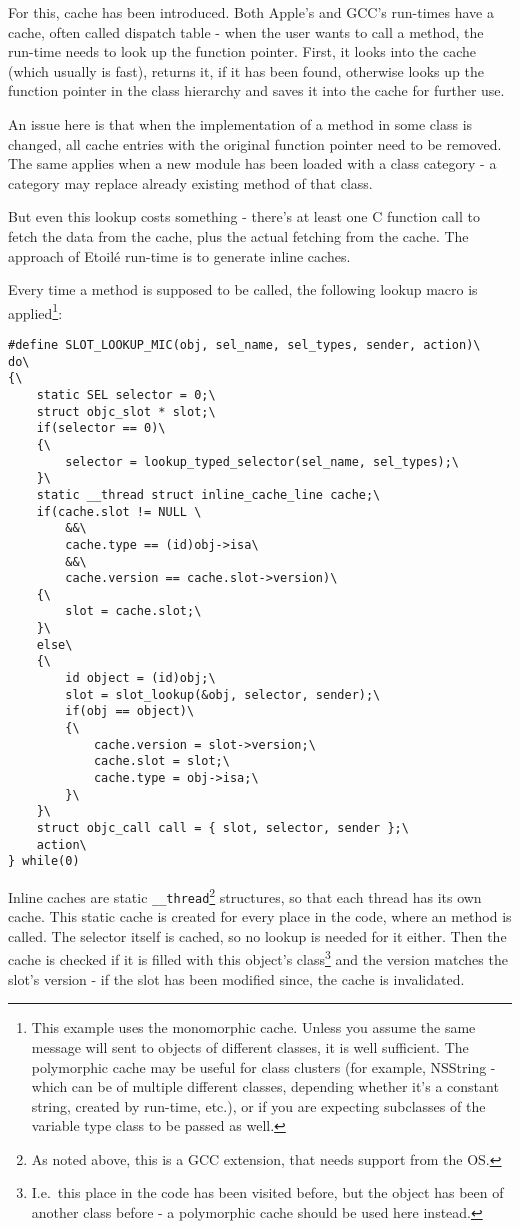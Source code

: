 For this, cache has been introduced. Both Apple's and GCC's run-times have a cache, often called dispatch table - when the user wants to call a method, the run-time needs to look up the function pointer. First, it looks into the cache (which usually is fast), returns it, if it has been found, otherwise looks up the function pointer in the class hierarchy and saves it into the cache for further use.

An issue here is that when the implementation of a method in some class is changed, all cache entries with the original function pointer need to be removed. The same applies when a new module has been loaded with a class category - a category may replace already existing method of that class.

But even this lookup costs something - there's at least one C function call to fetch the data from the cache, plus the actual fetching from the cache. The approach of Etoil\'e run-time is to generate inline caches.

Every time a method is supposed to be called, the following lookup macro is applied\footnote{This example uses the monomorphic cache. Unless you assume the same message will sent to objects of different classes, it is well sufficient. The polymorphic cache may be useful for class clusters (for example, NSString - which can be of multiple different classes, depending whether it's a constant string, created by run-time, etc.), or if you are expecting subclasses of the variable type class to be passed as well. }:

\begin{verbatim}
#define SLOT_LOOKUP_MIC(obj, sel_name, sel_types, sender, action)\
do\
{\
    static SEL selector = 0;\
    struct objc_slot * slot;\
    if(selector == 0)\
    {\
        selector = lookup_typed_selector(sel_name, sel_types);\
    }\
    static __thread struct inline_cache_line cache;\
    if(cache.slot != NULL \
        &&\
        cache.type == (id)obj->isa\
        &&\
        cache.version == cache.slot->version)\
    {\
        slot = cache.slot;\
    }\
    else\
    {\
        id object = (id)obj;\
        slot = slot_lookup(&obj, selector, sender);\
        if(obj == object)\
        {\
            cache.version = slot->version;\
            cache.slot = slot;\
            cache.type = obj->isa;\
        }\
    }\
    struct objc_call call = { slot, selector, sender };\
    action\
} while(0)
\end{verbatim}


Inline caches are static \verb=__thread=\footnote{As noted above, this is a GCC extension, that needs support from the OS.} structures, so that each thread has its own cache. This static cache is created for every place in the code, where an method is called. The selector itself is cached, so no lookup is needed for it either. Then the cache is checked if it is filled with this object's class\footnote{I.e.\ this place in the code has been visited before, but the object has been of another class before - a polymorphic cache should be used here instead.} and the version matches the slot's version - if the slot has been modified since, the cache is invalidated.

